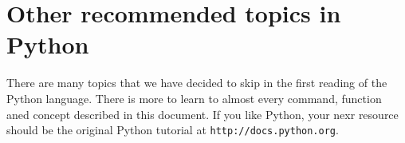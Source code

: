 
\section{Other recommended topics in Python} \label{sec:adv}

There are many topics that we have decided to skip in the first reading 
of the Python language. There is more to learn to almost every command,
function aned concept described in this document. If you like Python,
your nexr resource should be the original Python tutorial at 
{\tt http://docs.python.org}. 




